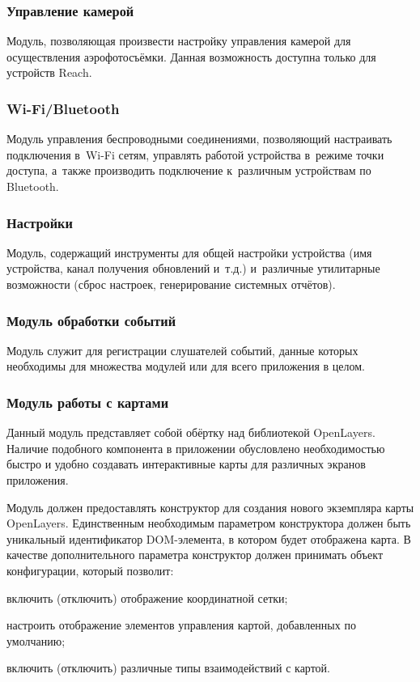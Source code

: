 \subsubsection{Управление камерой}

Модуль, позволяющая произвести настройку управления камерой для осуществления аэрофотосъёмки. Данная возможность доступна только для устройств Reach.


\subsubsection{Wi-Fi/Bluetooth}

Модуль управления беспроводными соединениями, позволяющий настраивать подключения в~Wi-Fi сетям, управлять работой устройства в~режиме точки доступа, а~также производить подключение к~различным устройствам по Bluetooth.


\subsubsection{Настройки}

Модуль, содержащий инструменты для общей настройки устройства (имя устройства, канал получения обновлений и~т.д.) и~различные утилитарные возможности (сброс настроек, генерирование системных отчётов).


\subsubsection{Модуль обработки событий}

Модуль служит для регистрации слушателей событий, данные которых необходимы для множества модулей или для всего приложения в целом.


\subsubsection{Модуль работы с картами}

Данный модуль представляет собой обёртку над библиотекой OpenLayers. Наличие подобного компонента в приложении обусловлено необходимостью быстро и удобно создавать интерактивные карты для различных экранов приложения.

Модуль должен предоставлять конструктор для создания нового экземпляра карты OpenLayers. Единственным необходимым параметром конструктора должен быть уникальный идентификатор DOM-элемента, в котором будет отображена карта. В качестве дополнительного параметра конструктор должен принимать объект конфигурации, который позволит:
\begin{dashitemize}
  \item включить (отключить) отображение координатной сетки;
  \item настроить отображение элементов управления картой, добавленных по умолчанию;
  \item включить (отключить) различные типы взаимодействий с картой.
\end{dashitemize}


